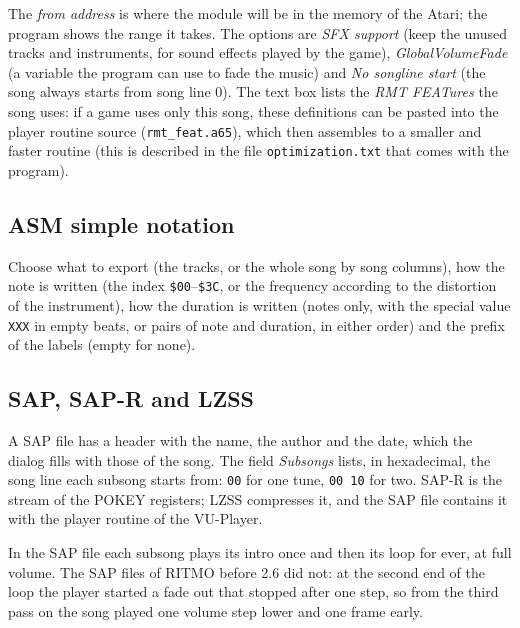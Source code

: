 
The \emph{from address} is where the module will be in the memory of the Atari; the program shows the range it takes. The
options are \emph{SFX support} (keep the unused tracks and instruments, for sound effects played by the game),
\emph{GlobalVolumeFade} (a variable the program can use to fade the music) and \emph{No songline start} (the song always starts from
song line 0). The text box lists the \emph{RMT FEATures} the song uses: if a game uses only this song, these definitions can be pasted into
the player routine source (\texttt{rmt\_feat.a65}), which then assembles to a smaller and faster routine
(this is described in the file \texttt{optimization.txt} that comes with the program).

\subsection{ASM simple notation}


Choose what to export (the tracks, or the whole song by song columns), how the note is written (the index \texttt{\$00}--\texttt{\$3C}, or the
frequency according to the distortion of the instrument), how the duration is written (notes only, with the special value
\texttt{XXX} in empty beats, or pairs of note and duration, in either order) and the prefix of the labels (empty for none).

\subsection{SAP, SAP-R and LZSS}


A SAP file has a header with the name, the author and the date, which the dialog fills with those of the song. The field
\emph{Subsongs} lists, in hexadecimal, the song line each subsong starts from: \texttt{00} for one tune, \texttt{00 10} for two. SAP-R is the stream of
the POKEY registers; LZSS compresses it, and the SAP file contains it with the player routine of the VU-Player.

In the SAP file each subsong plays its intro once and then its loop for ever, at full volume. The SAP files of RITMO before 2.6 did
not: at the second end of the loop the player started a fade out that stopped after one step, so from the third pass on the song
played one volume step lower and one frame early.


